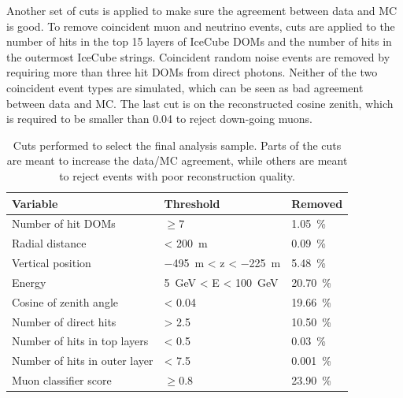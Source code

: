 Another set of cuts is applied to make sure the agreement between data and MC is good. To remove coincident muon and neutrino events, cuts are applied to the number of hits in the top 15 layers of IceCube DOMs and the number of hits in the outermost IceCube strings. Coincident random noise events are removed by requiring more than three hit DOMs from direct photons. Neither of the two coincident event types are simulated, which can be seen as bad agreement between data and MC. The last cut is on the reconstructed cosine zenith, which is required to be smaller than 0.04 to reject down-going muons.

\begin{table}
    \small
        \begin{tabular}{ lll }
        \hline\hline
    
        \textbf{Variable} & \textbf{Threshold} & \textbf{Removed} \\ 
    
        \hline\hline
    
        Number of hit DOMs & $\geq 7$ & \SI{1.05}{\percent} \\
        Radial distance & < \SI{200}{\meter} & \SI{0.09}{\percent} \\
        Vertical position & \SI{-495}{\meter} < z < \SI{-225}{\meter} & \SI{5.48}{\percent} \\
        Energy & \SI{5}{\giga\electronvolt} < E < \SI{100}{\giga\electronvolt} & \SI{20.70}{\percent} \\
    
        Cosine of zenith angle & < 0.04 & \SI{19.66}{\percent} \\
        Number of direct hits & > 2.5 & \SI{10.50}{\percent} \\
        Number of hits in top layers & < 0.5 & \SI{0.03}{\percent} \\
        Number of hits in outer layer & < 7.5 & \SI{0.001}{\percent} \\
        Muon classifier score & $\geq 0.8$ & \SI{23.90}{\percent} \\

        \hline
        \end{tabular}
    \caption[Final analysis cuts]{Cuts performed to select the final analysis sample. Parts of the cuts are meant to increase the data/MC agreement, while others are meant to reject events with poor reconstruction quality.}
    \end{table}
    


